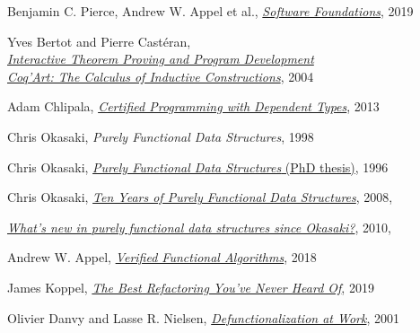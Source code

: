 \documentclass[declaration,mgr,english,shortabstract]{iithesis}
\begin{document}
\begin{thebibliography}{1}
    Benjamin C. Pierce, Andrew W. Appel et al.,
    \href{https://softwarefoundations.cis.upenn.edu/}{\textit{Software Foundations}},
    2019

    Yves Bertot and Pierre Castéran, \\
    \href{https://www.labri.fr/perso/casteran/CoqArt/}{\textit{Interactive Theorem Proving and Program Development \\ Coq'Art: The Calculus of Inductive Constructions}},
    2004

    Adam Chlipala,
    \href{http://adam.chlipala.net/cpdt/}{\textit{Certified Programming with Dependent Types}},
    2013

    Chris Okasaki,
    \textit{Purely Functional Data Structures},
    1998

    Chris Okasaki,
    \href{https://www.cs.cmu.edu/~rwh/theses/okasaki.pdf}{\textit{Purely Functional Data Structures} (PhD thesis)},
    1996

    Chris Okasaki,
    \href{https://okasaki.blogspot.com/2008/02/ten-years-of-purely-functional-data.html}{\textit{Ten Years of Purely Functional Data Structures}},
    2008, \\

    \href{https://cstheory.stackexchange.com/questions/1539/whats-new-in-purely-functional-data-structures-since-okasaki}{\textit{What's new in purely functional data structures since Okasaki?}},
    2010, \\

    Andrew W. Appel,
    \href{https://softwarefoundations.cis.upenn.edu/vfa-current/index.html}{\textit{Verified Functional Algorithms}},
    2018

    James Koppel,
    \href{http://www.pathsensitive.com/2019/07/the-best-refactoring-youve-never-heard.html}{\textit{The Best Refactoring You've Never Heard Of}},
    2019

    Olivier Danvy and Lasse R. Nielsen,
    \href{https://www.brics.dk/RS/01/23/BRICS-RS-01-23.pdf}{\textit{Defunctionalization at Work}},
    2001


\end{thebibliography}
\end{document}
